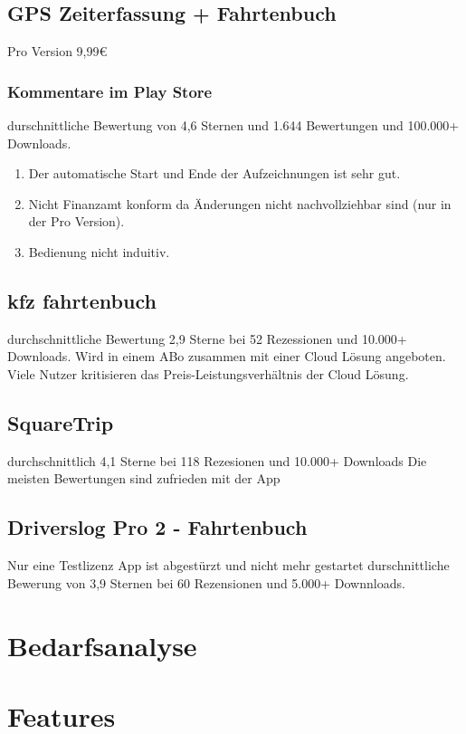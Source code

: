\documentclass[a4paper]{article}
\begin{document}
\subsection{GPS Zeiterfassung + Fahrtenbuch}
Pro Version 9,99€

\subsubsection{Kommentare im Play Store}
durschnittliche Bewertung von 4,6 Sternen und 1.644 Bewertungen und 100.000+ Downloads.
\\
\begin{enumerate}
    \item Der automatische Start und Ende der Aufzeichnungen ist sehr gut.
    \item Nicht Finanzamt konform da Änderungen nicht nachvollziehbar sind (nur in der Pro Version).
    \item Bedienung nicht induitiv.
\end{enumerate}


\subsection{kfz fahrtenbuch}
durchschnittliche Bewertung 2,9 Sterne bei 52 Rezessionen und 10.000+ Downloads.
Wird in einem ABo zusammen mit einer Cloud Lösung angeboten. Viele Nutzer kritisieren das
Preis-Leistungsverhältnis der Cloud Lösung.

\subsection{SquareTrip}
durchschnittlich 4,1 Sterne bei 118 Rezesionen und 10.000+ Downloads
Die meisten Bewertungen sind zufrieden mit der App

\subsection{Driverslog Pro 2 - Fahrtenbuch}
Nur eine Testlizenz
App ist abgestürzt und nicht mehr gestartet
durschnittliche Bewerung von 3,9 Sternen bei 60 Rezensionen und 5.000+ Downnloads.

\section{Bedarfsanalyse}

\section{Features}
\end{document}
